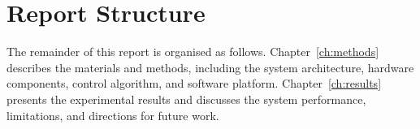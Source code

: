 \section{Report Structure}

The remainder of this report is organised as follows. Chapter~\ref{ch:methods} describes the materials and methods, including the system architecture, hardware components, control algorithm, and software platform. Chapter~\ref{ch:results} presents the experimental results and discusses the system performance, limitations, and directions for future work.

